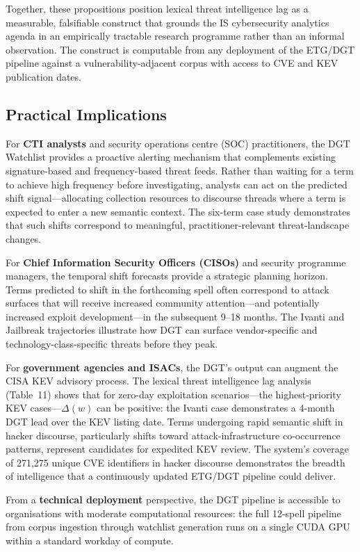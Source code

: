 \documentclass[12pt]{article}
\begin{document}
Together, these propositions position lexical threat intelligence lag as a measurable, falsifiable construct that grounds the IS cybersecurity analytics agenda in an empirically tractable research programme rather than an informal observation. The construct is computable from any deployment of the ETG/DGT pipeline against a vulnerability-adjacent corpus with access to CVE and KEV publication dates.

\subsection{Practical Implications}

For \textbf{CTI analysts} and security operations centre (SOC) practitioners, the DGT Watchlist provides a proactive alerting mechanism that complements existing signature-based and frequency-based threat feeds. Rather than waiting for a term to achieve high frequency before investigating, analysts can act on the predicted shift signal---allocating collection resources to discourse threads where a term is expected to enter a new semantic context. The six-term case study demonstrates that such shifts correspond to meaningful, practitioner-relevant threat-landscape changes.

For \textbf{Chief Information Security Officers (CISOs)} and security programme managers, the temporal shift forecasts provide a strategic planning horizon. Terms predicted to shift in the forthcoming spell often correspond to attack surfaces that will receive increased community attention---and potentially increased exploit development---in the subsequent 9--18 months. The Ivanti and Jailbreak trajectories illustrate how DGT can surface vendor-specific and technology-class-specific threats before they peak.

For \textbf{government agencies and ISACs}, the DGT's output can augment the CISA KEV advisory process. The lexical threat intelligence lag analysis (Table~11) shows that for zero-day exploitation scenarios---the highest-priority KEV cases---$\Delta(w)$ can be positive: the Ivanti case demonstrates a 4-month DGT lead over the KEV listing date. Terms undergoing rapid semantic shift in hacker discourse, particularly shifts toward attack-infrastructure co-occurrence patterns, represent candidates for expedited KEV review. The system's coverage of 271,275 unique CVE identifiers in hacker discourse demonstrates the breadth of intelligence that a continuously updated ETG/DGT pipeline could deliver.

From a \textbf{technical deployment} perspective, the DGT pipeline is accessible to organisations with moderate computational resources: the full 12-spell pipeline from corpus ingestion through watchlist generation runs on a single CUDA GPU within a standard workday of compute.
\end{document}
